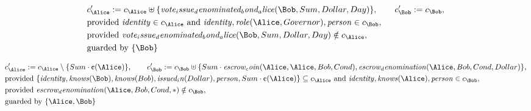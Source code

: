 \begin{align*}
&
c'_
{
\Alice
}
 := 
c_
{
\Alice
}
 \uplus 
\{
\mathit{
vote_issue_denominated_bond_alice
}
(
\Bob
,
Sum
,
Dollar
,
Day
)
\}
, \qquad 
c'_
{
\Bob
}
 := 
c_
{
\Bob
}
,\\
&
\text{provided } 
\mathit{
identity
}
 \in c_
{
\Alice
}
 \text{ and } 
\mathit{
identity
}
,
\mathit{
role
}
(
\Alice
,
Governor
)
,
\mathit{
person
}
 \in c_
{
\Bob
}
,\\
&
\text{provided } 
\mathit{
vote_issue_denominated_bond_alice
}
(
\Bob
,
Sum
,
Dollar
,
Day
)
 \notin c_
{
\Alice
}
,\\
&
\text{guarded by } \{
\Bob
\}
\end{align*}

\begin{align*}
&
c'_
{
\Alice
}
 := 
c_
{
\Alice
}
 \setminus 
\{
Sum
\cdot
\text{\textcent}
(
\Alice
)
\}
, \qquad 
c'_
{
\Bob
}
 := 
c_
{
\Bob
}
 \uplus 
\{
Sum
\cdot
\mathit{
escrow_coin
}
(
\Alice
,
\Alice
,
Bob
,
Cond
)
,
\mathit{
escrow_denomination
}
(
\Alice
,
Bob
,
Cond
,
Dollar
)
\}
,\\
&
\text{provided } 
\{
\mathit{
identity
}
,
\mathit{
knows
}
(
\Bob
)
,
\mathit{
knows
}
(
Bob
)
,
\mathit{
issued_in
}
(
Dollar
)
,
\mathit{
person
}
,
Sum
\cdot
\text{\textcent}
(
\Alice
)
\}
 \subseteq c_
{
\Alice
}
 \text{ and } 
\mathit{
identity
}
,
\mathit{
knows
}
(
\Alice
)
,
\mathit{
person
}
 \in c_
{
\Bob
}
,\\
&
\text{provided } 
\mathit{
escrow_denomination
}
(
\Alice
,
Bob
,
Cond
,
\ast
)
 \notin c_
{
\Bob
}
,\\
&
\text{guarded by } \{
\Alice
,
\Bob
\}
\end{align*}

